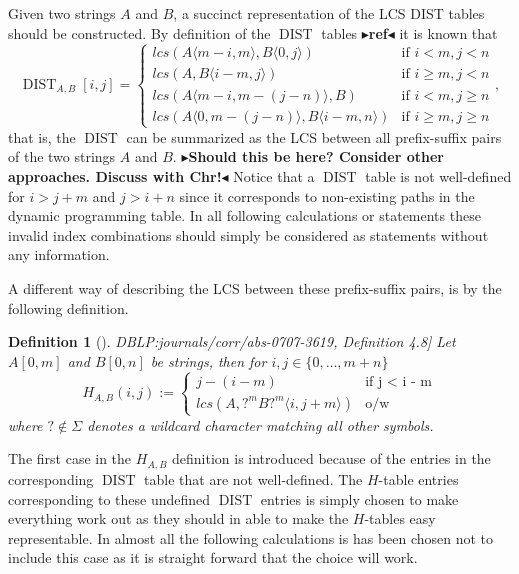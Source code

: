 \documentclass[twoside,11pt,openright]{report}
\newcommand{\todo}[1]{{\color[rgb]{.5,0,0}\textbf{$\blacktriangleright$#1$\blacktriangleleft$}}}
\newcommand{\DIST}{\operatorname{DIST}}
\newcommand{\substr}[3]{#1\langle #2, #3 \rangle}
\newcommand{\str}[3]{#1[#2, #3]}
\newcommand{\refbook}[2]{\cite[#1]{DBLP:journals/corr/abs-0707-3619}, #2}
\newtheorem{mydef}{Definition}
\begin{document}
Given two strings $A$ and $B$, a succinct representation of the LCS DIST tables should be constructed. By definition of the $\DIST$ tables \todo{ref} it is known that
\[
  \DIST_{A,B}[i, j] = \left\{
    \begin{array}{ll}
      lcs(\substr{A}{m - i}{m}, \substr{B}{0}{j})             & \text{if } i < m, j < n \\
      lcs(A, \substr{B}{i - m}{j})                            & \text{if } i \geq m, j < n \\
      lcs(\substr{A}{m - i}{m - (j - n)}, B)                  & \text{if } i < m, j \geq n \\
      lcs(\substr{A}{0}{m - (j - n)}, \substr{B}{i - m}{n})   & \text{if } i \geq m, j \geq n
    \end{array}
  \right. ,
\]
that is, the $\DIST$ can be summarized as the LCS between all prefix-suffix pairs of the two strings $A$ and $B$.
\todo{Should this be here? Consider other approaches. Discuss with Chr!} Notice that a $\DIST$ table is not well-defined for $i > j + m$ and $j > i + n$ since it corresponds to non-existing paths in the dynamic programming table. In all following calculations or statements these invalid index combinations should simply be considered as statements without any information.

A different way of describing the LCS between these prefix-suffix pairs, is by the following definition.

\begin{mydef}[\refbook{p.-48}{Definition 4.8}]
  \label{def:H-table}
  Let $\str{A}{0}{m}$ and $\str{B}{0}{n}$ be strings, then for $i, j \in \{ 0, \dots, m + n \}$
  \[
    H_{A,B}(i, j) := \begin{cases}
                        j - (i - m)                         & \text{if j < i - m} \\
                        lcs(A, \substr{?^mB?^m}{i}{j + m})  & \text{o/w}
                      \end{cases}
  \]
  where $? \not\in \Sigma$ denotes a wildcard character matching all other symbols.
\end{mydef}
The first case in the $H_{A,B}$ definition is introduced because of the entries in the corresponding $\DIST$ table that are not well-defined. The $H$-table entries corresponding to these undefined $\DIST$ entries is simply chosen to make everything work out as they should in able to make the $H$-tables easy representable. In almost all the following calculations is has been chosen not to include this case as it is straight forward that the choice will work.
\end{document}
